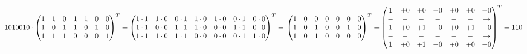 $1010010 \cdot \begin{pmatrix}
1 & 1 & 0 & 1 & 1 & 0 & 0\\
1 & 0 & 1 & 1 & 0 & 1 & 0\\
1 & 1 & 1 & 0 & 0 & 0 & 1
\end{pmatrix}^T = \begin{pmatrix}
1 \cdot 1 & 1 \cdot 0 & 0 \cdot 1 & 1 \cdot 0 & 1 \cdot 0 & 0 \cdot 1 & 0 \cdot 0\\
1 \cdot 1 & 0 \cdot 0 & 1 \cdot 1 & 1 \cdot 0 & 0 \cdot 0 & 1 \cdot 1 & 0 \cdot 0\\
1 \cdot 1 & 1 \cdot 0 & 1 \cdot 1 & 0 \cdot 0 & 0 \cdot 0 & 0 \cdot 1 & 1 \cdot 0
\end{pmatrix}^T =\\~\\~\\ \begin{pmatrix}
1 & 0 & 0 & 0 & 0 & 0 & 0\\
1 & 0 & 1 & 0 & 0 & 1 & 0\\
1 & 0 & 1 & 0 & 0 & 0 & 0
\end{pmatrix}^T = \begin{pmatrix}
1 & +0 & +0 & +0 & +0 & +0 & +0\\
- & - & - & - & - & - & \rightarrow\\
1 & +0 & +1 & +0 & +0 & +1 & +0\\
- & - & - & - & - & - & \rightarrow\\
1 & +0 & +1 & +0 & +0 & +0 & +0
\end{pmatrix}^T = 110$